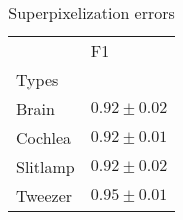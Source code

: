 \begin{table}[htbp]
\centering
\caption{Superpixelization errors}
\label{tab:sp_errors}
\begin{tabular}{lp{1.8cm}}
\toprule
{} &               F1 \\
Types    &                  \\
\midrule
Brain    &  $0.92 \pm 0.02$ \\
Cochlea  &  $0.92 \pm 0.01$ \\
Slitlamp &  $0.92 \pm 0.02$ \\
Tweezer  &  $0.95 \pm 0.01$ \\
\bottomrule
\end{tabular}
\end{table}
